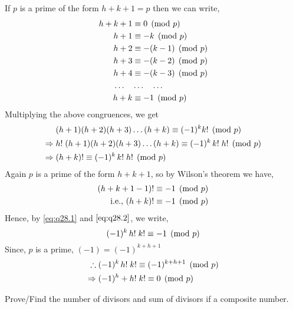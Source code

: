 \documentclass[12pt,class=book,crop=false]{standalone}
\begin{document}
\begin{soln}
    If $ p $ is a prime of the form $ h+k+1=p $ then we can write,
    \begin{align*}
        h+k+1&\equiv 0 \pmod{p}\\
        h+1&\equiv -k \pmod{p}\\
        h+2&\equiv -(k-1) \pmod{p}\\
        h+3&\equiv -(k-2) \pmod{p}\\
        h+4&\equiv -(k-3) \pmod{p}\\
        \dots\quad&\dots\quad \dots\\
        h+k&\equiv -1 \pmod{p}
    \end{align*}
    Multiplying the above congruences, we get 
    \begin{align}
        & (h+1)(h+2)(h+3)\dots(h+k)\equiv (-1)^k k! \pmod{p}\notag\\
        \Rightarrow\;& h!\; (h+1)(h+2)(h+3)\dots(h+k)\equiv (-1)^k \,k!\; h! \pmod{p}\notag\\
        \Rightarrow\;& (h+k)! \equiv (-1)^k\, k!\; h! \pmod{p}\label{eq:q28.1}
    \end{align}
    Again $ p $ is a prime of the form $ h+k+1 $, so by Wilson's theorem we have,
    \begin{align}
        (h+k+1-1)!&\equiv -1 \pmod{p}\notag\\
        \text{i.e., }(h+k)!&\equiv -1 \pmod{p}\label{eq:q28.2}
    \end{align}
    Hence, by \eqref{eq:q28.1} and $ \eqref{eq:q28.2} $, we write,
    \[(-1)^k\, h!\;k!\equiv -1 \pmod{p}\]
    Since, $ p $ is a prime, $ (-1)=(-1)^{k+h+1} $
    \begin{align*}
        \therefore\;&(-1)^k\, h!\;k!\equiv (-1)^{k+h+1} \pmod{p}\\
        \Rightarrow\;&(-1)^h+ h!\;k!\equiv 0 \pmod{p}
    \end{align*}
\end{soln}
\begin{qn}
    Prove/Find the number of divisors and sum of divisors if a composite number.
\end{qn}
\end{document}

